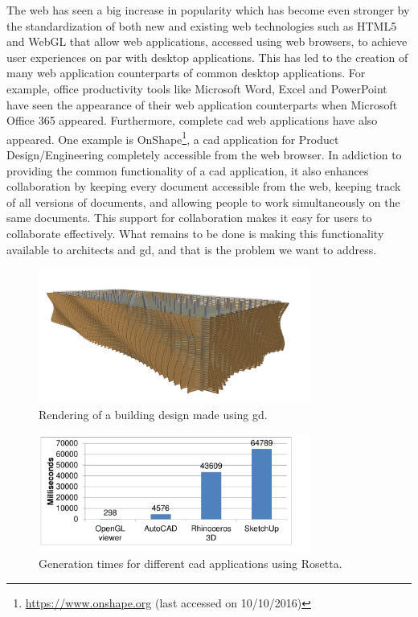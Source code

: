 The web has seen a big increase in popularity which has become even stronger by the standardization of both new and existing web technologies such as HTML5\cite{hickson2011html5} and WebGL\cite{marrin2011webgl} that allow web applications, accessed using web browsers, to achieve user experiences on par with desktop applications.
This has led to the creation of many web application counterparts of common desktop applications.
For example, office productivity tools like Microsoft Word, Excel and PowerPoint have seen the appearance of their web application counterparts when Microsoft Office 365 appeared.
Furthermore, complete \gls{cad} web applications have also appeared.
One example is OnShape\footnote{\url{https://www.onshape.org} (last accessed on 10/10/2016)}, a \gls{cad} application for Product Design/Engineering completely accessible from the web browser.
In addiction to providing the common functionality of a \gls{cad} application, it also enhances collaboration by keeping every document accessible from the web, keeping track of all versions of documents, and allowing people to work simultaneously on the same documents.
This support for collaboration makes it easy for users to collaborate effectively.
What remains to be done is making this functionality available to architects and \gls{gd}, and that is the problem we want to address.

\begin{figure}
	\centering
	\includegraphics[width=0.8\textwidth]{images/carmo_render}
	\caption{Rendering of a building design made using \gls{gd}.}
	\label{fig:carmo:render}
\end{figure}

\begin{figure}
	\centering
	\includegraphics[width=0.8\textwidth]{images/carmo_rosetta_times}
	\caption{Generation times for different \gls{cad} applications using Rosetta.}
	\label{fig:carmo:times}
\end{figure}


